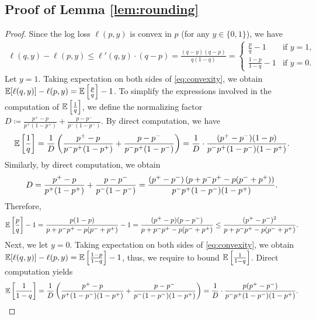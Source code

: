 \subsection{Proof of Lemma \ref{lem:rounding}}
\begin{proof}
    Since the log loss $\ell(p, y)$ is convex in $p$ (for any $y \in \{0, 1\}$), we have \begin{align}\label{eq:convexity}
    \ell(q, y) - \ell(p, y) \le \ell'(q, y) \cdot (q - p) = \frac{(q - y)(q - p)}{q(1 - q)} = \begin{cases}
        \frac{p}{q} - 1 & \text{if } y = 1, \\
        \frac{1 - p}{1 - q} - 1 & \text{if } y = 0.
    \end{cases}
    \end{align}
    Let $y = 1$. Taking expectation on both sides of \eqref{eq:convexity}, we obtain $\mathbb{E}[\ell(q, y)] - \ell(p, y) = \mathbb{E}\left[ \frac{p}{q} \right] - 1$. To simplify the expressions involved in the computation of $\mathbb{E}\left[ \frac{1}{q} \right]$, we define the normalizing factor $D \coloneqq \frac{p^{+} - p}{p^{+}(1 - p^{+})} + \frac{p - p^{-}}{p^{-}(1 - p^{-})}$. By direct computation, we have \begin{align*}
        \mathbb{E}\left[ \frac{1}{q} \right] = \frac{1}{D} \left( \frac{p^{+} - p}{p^{-}p^{+}(1 - p^{+})} + \frac{p - p^{-}}{p^{-}p^{+}(1 - p^{-})} \right) = \frac{1}{D} \cdot \frac{(p^{+} - p^{-})(1 - p)}{p^{-}p^{+}(1 - p^{-})(1 - p^{+})}.
    \end{align*}
    Similarly, by direct computation, we obtain \begin{align*}
        D = \frac{p^{+} - p}{p^{+}(1 - p^{+})} + \frac{p - p^{-}}{p^{-}(1 - p^{-})} = \frac{(p^{+} - p^{-})\left( p + p^{-}p^{+} - p(p^{-} + p^{+}) \right)}{p^{-}p^{+}(1 - p^{-})(1 - p^{+})}.
    \end{align*}
    Therefore, \begin{align*}
        \mathbb{E}\left[ \frac{p}{q} \right] - 1 = \frac{p(1 - p)}{p + p^{-}p^{+} - p(p^{-} + p^{+})} - 1 = \frac{(p^{+} - p)(p - p^{-})}{p + p^{-}p^{+} - p(p^{-} + p^{+})} \le \frac{(p^{+} - p^{-}) ^ {2}}{p + p^{-}p^{+} - p(p^{-} + p^{+})}. 
    \end{align*}
    Next, we let $y = 0$. Taking expectation on both sides of \eqref{eq:convexity}, we obtain $\mathbb{E}[\ell(q, y)] - \ell(p, y) = \mathbb{E}\left[ \frac{1 - p}{1 - q} \right] - 1$, thus, we require to bound $\mathbb{E}\left[ \frac{1}{1 - q} \right]$. Direct computation yields \begin{align*}
        \mathbb{E}\bigs{\frac{1}{1 - q}} = \frac{1}{D}\bigc{\frac{p^{+} - p}{p^{+}(1 - p^{-})(1 - p^{+})} + \frac{p - p^{-}}{p^{-}(1 - p^{-})(1 - p^{+})}} = \frac{1}{D} \cdot \frac{p(p^{+} - p^{-})}{p^{-}p^{+}(1 - p^{-})(1 - p^{+})}.

\end{align*}
\end{proof}
